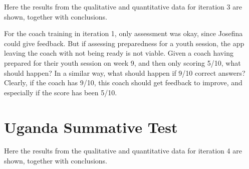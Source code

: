 Here the results from the qualitative and quantitative data for iteration 3 are shown, together with conclusions.

For the coach training in iteration 1, only assessment was okay, since Josefina could give feedback. But if assessing preparedness for a youth session, the app leaving the coach with not being ready is not viable. Given a coach having prepared for their youth session on week 9, and then only scoring 5/10, what should happen? In a similar way, what should happen if 9/10 correct answers? Clearly, if the coach has 9/10, this coach should get feedback to improve, and especially if the score has been 5/10.





\section{Uganda Summative Test}

Here the results from the qualitative and quantitative data for iteration 4 are shown, together with conclusions.





%
%
%  
%  
%  
%  
%
%
%
%  
%  
%  
%  
%
%
%  
%  
%  
%  


%


